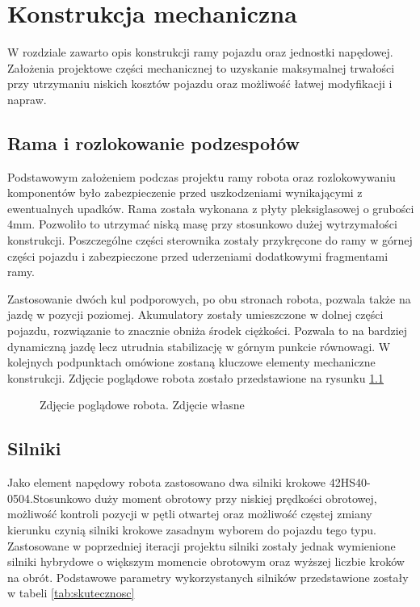 \chapter{Konstrukcja mechaniczna}
\label{cha:KonstrukcjaMechaniczna}

W rozdziale zawarto opis konstrukcji ramy pojazdu oraz jednostki napędowej. Założenia projektowe części mechanicznej to uzyskanie maksymalnej trwałości przy utrzymaniu niskich kosztów pojazdu oraz możliwość łatwej modyfikacji i napraw. 

\section{Rama i rozlokowanie podzespołów}
Podstawowym założeniem podczas projektu ramy robota oraz rozlokowywaniu komponentów było zabezpieczenie przed uszkodzeniami wynikającymi z ewentualnych upadków. Rama została wykonana z płyty pleksiglasowej o grubości 4mm. Pozwoliło to utrzymać niską masę przy stosunkowo dużej wytrzymałości konstrukcji. Poszczególne części sterownika zostały przykręcone do ramy w górnej części pojazdu i zabezpieczone przed uderzeniami dodatkowymi fragmentami ramy.

Zastosowanie dwóch kul podporowych, po obu stronach robota, pozwala także na jazdę w pozycji poziomej. Akumulatory zostały umieszczone w dolnej części pojazdu, rozwiązanie to znacznie obniża środek ciężkości. Pozwala to na bardziej dynamiczną jazdę lecz utrudnia stabilizację w górnym punkcie równowagi. W kolejnych podpunktach omówione zostaną kluczowe elementy mechaniczne konstrukcji. Zdjęcie poglądowe robota zostało przedstawione na rysunku \ref{zdj_robot}

\begin{figure}[h]
	\centering
	\caption{ Zdjęcie poglądowe robota. Zdjęcie własne}
	\label{zdj_robot}
\end{figure}

\section{Silniki}

Jako element napędowy robota zastosowano dwa silniki krokowe 42HS40-0504.Stosunkowo duży moment obrotowy przy niskiej prędkości obrotowej, możliwość kontroli pozycji w pętli otwartej oraz możliwość częstej zmiany kierunku czynią silniki krokowe zasadnym wyborem do pojazdu tego typu. Zastosowane w poprzedniej iteracji projektu silniki zostały jednak wymienione silniki hybrydowe o większym momencie obrotowym oraz wyższej liczbie kroków na obrót. Podstawowe parametry wykorzystanych silników przedstawione zostały w tabeli \ref{tab:skutecznosc}

